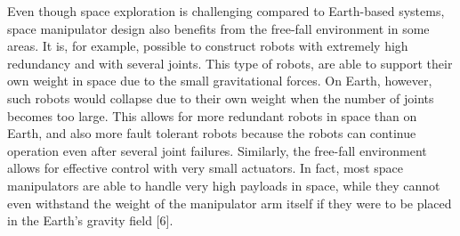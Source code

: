 \documentclass[a4paper,12pt,oneside]{report}
\begin{document}
Even though space exploration is challenging compared to Earth-based systems, space manipulator design also benefits from the free-fall environment in some areas. It is, for example, possible to construct robots with extremely high redundancy and with several joints. This type of robots, are able to support their own weight in space due to the small gravitational forces. On Earth, however, such robots would collapse due to their own weight when the number of joints becomes too large. This allows for more redundant robots in space than on Earth, and also more fault tolerant robots because the robots can continue operation even after several joint failures. Similarly, the free-fall environment allows for effective control with very small actuators. In fact, most space manipulators are able to handle very high payloads in space, while they cannot even withstand the weight of the manipulator arm itself if they were to be placed in the Earth’s gravity field [6].\\
\end{document}
